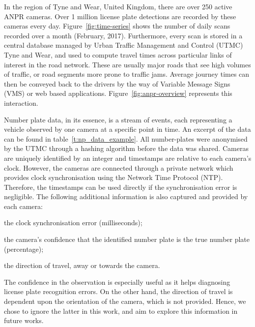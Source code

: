 In the region of Tyne and Wear, United Kingdom, there are over 250 active ANPR cameras. Over 1 million license plate detections are recorded by these cameras every day. Figure~\ref{fig:time-series} shows the number of daily scans recorded over a month (February, 2017). Furthermore, every scan is stored in a central database managed by Urban Traffic Management and Control (UTMC) Tyne and Wear, and used to compute travel times across particular links of interest in the road network. These are usually major roads that see high volumes of traffic, or road segments more prone to traffic jams. Average journey times can then be conveyed back to the drivers by the way of Variable Message Signs (VMS) or web based applications. Figure~\ref{fig:anpr-overview} represents this interaction.

Number plate data, in its essence, is a stream of events, each representing a vehicle observed by one camera at a specific point in time. An excerpt of the data can be found in table~\ref{t:np_data_example}. All number-plates were anonymised by the UTMC through a hashing algorithm before the data was shared. Cameras are uniquely identified by an integer and timestamps are relative to each camera's clock. However, the cameras are connected through a private network which provides clock synchronisation using the Network Time Protocol (NTP). Therefore, the timestamps can be used directly if the synchronisation error is negligible. The following additional information is also captured and provided by each camera:
\begin{enumerate*}[label=(\roman*)]
  \item the clock synchronisation error (milliseconds);
  \item the camera's confidence that the identified number plate is the true number plate (percentage);
  \item the direction of travel, away or towards the camera.
\end{enumerate*}
The confidence in the observation is especially useful as it helps diagnosing license plate recognition errors. On the other hand, the direction of travel is dependent upon the orientation of the camera, which is not provided. Hence, we chose to ignore the latter in this work, and aim to explore this information in future works.

